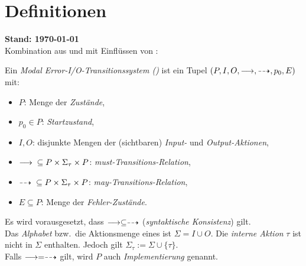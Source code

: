 \chapter{Definitionen}
{\large\textbf{Stand: \today{}}}\\

Kombination aus \cite{Vogler2015FailSem} und \cite{Schinko2016BA} mit
Einflüssen von \cite{Vogler2016MIA3}:

\begin{Def}
  Ein \emph{Modal Error-I/O-Transitionssystem (\MEIO{})} ist ein Tupel
  $(P,I,O,\must,\may,p_0,E)$ mit:
  \begin{itemize}
    \item $P$: Menge der \emph{Zustände},
    \item $p_0\in P$: \emph{Startzustand},
    \item $I,O$: disjunkte Mengen der (sichtbaren) \emph{Input-} und
      \emph{Output-Aktionen},
    \item $\must{} \subseteq P\times \Sigma_{\tau}\times P$:
      \emph{must-Transitions-Relation},
    \item $\may{} \subseteq P\times \Sigma_{\tau}\times P$:
      \emph{may-Transitions-Relation},
    \item $E\subseteq P$: Menge der \emph{Fehler-Zustände}.
  \end{itemize}
  Es wird vorausgesetzt, dass $\must\subseteq\may$ (\emph{syntaktische
  Konsistenz}) gilt.\\
  Das \emph{Alphabet} bzw.\ die Aktionsmenge eines \MEIO{} ist $\Sigma = I\cup
  O$. Die \emph{interne Aktion} $\tau$ ist nicht in $\Sigma$ enthalten. Jedoch
  gilt $\Sigma_{\tau} := \Sigma \cup \{\tau\}$.\\
  Falls $\must =\may$ gilt, wird $P$ auch \emph{Implementierung} genannt.
\end{Def}

